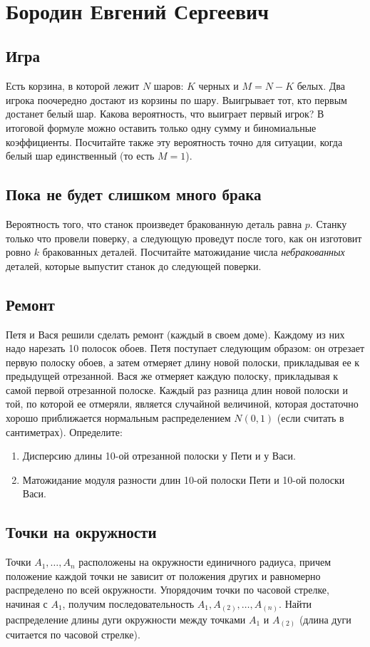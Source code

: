 \documentclass[12pt]{article}
\begin{document}
\newpage
~
\newpage
\section{Бородин Евгений Сергеевич}

\subsection{Игра}
Есть корзина, в которой лежит $N$ шаров: $K$ черных и $M = N - K$ белых. Два игрока поочередно достают из корзины по шару. Выигрывает тот, кто первым достанет белый шар. Какова вероятность, что выиграет первый игрок? В итоговой формуле можно оставить только одну сумму и биномиальные коэффициенты. Посчитайте также эту вероятность точно для ситуации, когда белый шар единственный (то есть $M = 1$).

\subsection{Пока не будет слишком много брака}
Вероятность того, что станок произведет бракованную деталь равна $p$. Станку только что провели поверку, а следующую проведут после того, как он изготовит ровно $k$ бракованных деталей. Посчитайте матожидание числа \emph{небракованных} деталей, которые выпустит станок до следующей поверки.

\subsection{Ремонт}
Петя и Вася решили сделать ремонт (каждый в своем доме). Каждому из них надо нарезать 10 полосок обоев. Петя поступает следующим образом: он отрезает первую полоску обоев, а затем отмеряет длину новой полоски, прикладывая ее к предыдущей отрезанной. Вася же отмеряет каждую полоску, прикладывая к самой первой отрезанной полоске. Каждый раз разница длин новой полоски и той, по которой ее отмеряли, является случайной величиной, которая достаточно хорошо приближается нормальным распределением $N(0, 1)$ (если считать в сантиметрах). Определите:
\begin{enumerate}
    \item Дисперсию длины 10-ой отрезанной полоски у Пети и у Васи.
    \item Матожидание модуля разности длин 10-ой полоски Пети и 10-ой полоски Васи. 
\end{enumerate}

\subsection{Точки на окружности}
Точки $A_1, \dots, A_n$ расположены на окружности единичного радиуса, причем положение каждой точки не зависит от положения других и равномерно распределено по всей окружности. Упорядочим точки по часовой стрелке, начиная с $A_1$, получим последовательность $A_1, A_{(2)}, \dots, A_{(n)}$. Найти распределение длины дуги окружности между точками $A_1$ и $A_{(2)}$ (длина дуги считается по часовой стрелке).
\end{document}
